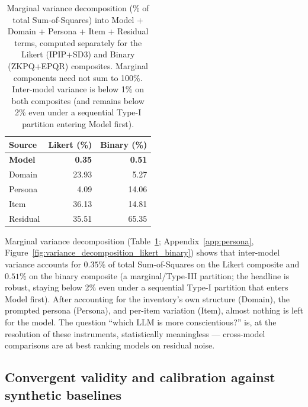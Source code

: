 \documentclass[11pt]{article}
\begin{document}
\begin{table}[t]
\centering
\small
\begin{tabular}{lrr}
\toprule
Source & Likert (\%) & Binary (\%) \\
\midrule
\textbf{Model}    & \textbf{0.35} & \textbf{0.51} \\
Domain   & 23.93 & 5.27  \\
Persona  & 4.09  & 14.06 \\
Item     & 36.13 & 14.81 \\
Residual & 35.51 & 65.35 \\
\bottomrule
\end{tabular}
\caption{Marginal variance decomposition (\% of total Sum-of-Squares) into Model + Domain + Persona + Item + Residual terms, computed separately for the Likert (IPIP+SD3) and Binary (ZKPQ+EPQR) composites. Marginal components need not sum to 100\%. Inter-model variance is below 1\% on both composites (and remains below 2\% even under a sequential Type-I partition entering Model first).}
\label{tab:variance}
\end{table}

Marginal variance decomposition (Table~\ref{tab:variance}; Appendix~\ref{app:persona}, Figure~\ref{fig:variance_decomposition_likert_binary}) shows that inter-model variance accounts for $0.35\%$ of total Sum-of-Squares on the Likert composite and $0.51\%$ on the binary composite (a marginal/Type-III partition; the headline is robust, staying below 2\% even under a sequential Type-I partition that enters Model first). After accounting for the inventory's own structure (Domain), the prompted persona (Persona), and per-item variation (Item), almost nothing is left for the model. The question ``which LLM is more conscientious?'' is, at the resolution of these instruments, statistically meaningless --- cross-model comparisons are at best ranking models on residual noise.

\subsection{Convergent validity and calibration against synthetic baselines}
\label{sec:results-convergent}
\end{document}
